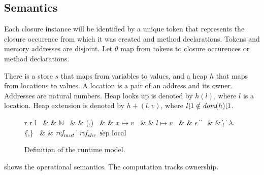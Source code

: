 \subsection{Semantics}
Each closure instance will be identified by a unique token that represents the closure occurence from which it was created \cite{kassios2010specification} and method declarations. Tokens and memory addresses are disjoint. Let $\theta$ map from tokens to closure occurences or method declarations.

There is a store $s$ that maps from variables to values, and a heap $h$ that maps from locations to values. A location is a pair of an address and its owner. Addresses are natural numbers. 
Heap looks up is denoted by $h(l)$, where $l$ is a location. Heap extension is denoted by $h + (l, v)$, where $\RESTRICT{l}{1} \notin \RESTRICT{\DOM(h)}{1}$. 

\begin{figure}[!ht]
\small
\centering
\begin{grammar}%
\begin{tabular}{r r l}
$~$ & \: & $\mathbb{N}$
$~$ & \: & (,)
$~$ & \: & $\overline{x \mapsto v}$
$~$ & \: & $\overline{l \mapsto v}$
$~$ & \: & $\epsilon$ \|  \|  
$~$ & \: &  \| $_l$ \| $\lambda$. \| \{,\}
$~$ & \: & $\textit{ref}_{mut}$ \| $\textit{ref}_{shr}$  \| sep \| local
\end{tabular} %
\end{grammar}
\caption{Definition of the runtime model.}
\label{fig:runtime}
\end{figure}


 shows the operational semantics. The computation tracks ownership.

